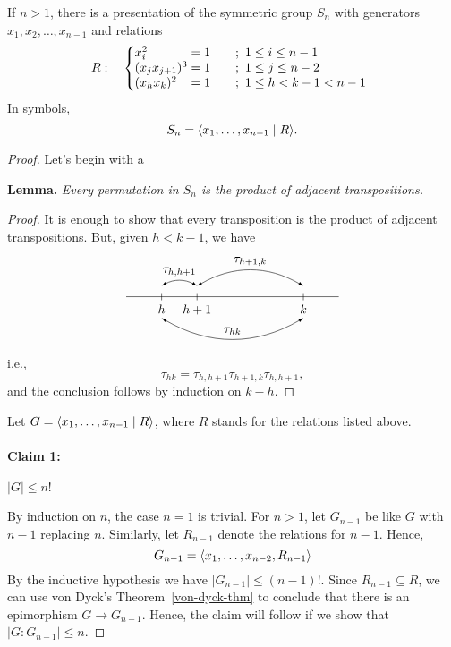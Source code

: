 \begin{xmpl}
    If $n > 1$, there is a presentation of the symmetric group $S_n$ with generators $x_1,x_2, \dots,x_{n-1}$ and relations
    $$
    R:\quad \left\{
    \begin{array}{@{}l@{}l@{}l}
        x_i^2 &= 1  &\qquad;\ 1\le i\le n-1\\
        (x_jx_{j+1})^3\;&= 1&\qquad;\ 1\le j\le n-2\\
        (x_hx_k)^2 &= 1&\qquad;\ 1\le h<k-1<n-1
    \end{array}
    \right.
    $$
    In symbols,
    $$
        S_n = \langle x_1,\dots,x_{n-1}\mid R\rangle.
    $$
\end{xmpl}

\begin{proof} Let's begin with a

\textbf{Lemma.}
    \textit{Every permutation in\/ $S_n$ is the product of adjacent transpositions.}

\begin{proof}
    It is enough to show that every transposition is the product of adjacent transpositions. But, given $h<k-1$, we have
    $$
        \begin{tikzpicture}
          \draw[-] (-1,0) -- (5,0);
          \foreach \x/\label in {0/h, 1/h+1, 4/k} {
            \draw(\x,0.1) -- (\x,-0.1) node[below] {\(\label\)};
          }
          \draw[latex-latex, bend left=30] (0, 0.3) to node[midway, above] 
            {\(\tau_{h,h+1}\)} (1, 0.3);
          \draw[latex-latex, bend left=30] (1, 0.3) to node[midway, above]
            {\(\tau_{h+1,k}\)} (4, 0.3);
          \draw[latex-latex, bend right=30] (0, -0.6) to node[midway, above]
            {\(\tau_{hk}\)} (4, -0.6);
        \end{tikzpicture}
    $$
    i.e.,
    $$
        \tau_{hk} = \tau_{h,h+1}\tau_{h+1,k}\tau_{h,h+1},
    $$
    and the conclusion follows by induction on $k-h$.
    \renewcommand{\qedsymbol}{\sc qed}
\end{proof}

Let $G=\langle x_1,\dots,x_{n-1}\mid R\rangle$, where $R$ stands for the relations listed above.

\paragraph{Claim 1:}$|G|\le n!$

By induction on $n$, the case $n=1$ is trivial. For $n>1$, let $G_{n-1}$ be like $G$ with $n-1$ replacing $n$. Similarly, let $R_{n-1}$ denote the relations for $n-1$. Hence,
$$
    G_{n-1}=\langle x_1,\dots,x_{n-2}, R_{n-1}\rangle
$$
By the inductive hypothesis we have $|G_{n-1}|\le (n-1)!$. Since $R_{n-1}\subseteq R$, we can use von Dyck's Theorem~\ref{von-dyck-thm} to conclude that there is an epimorphism $G\to G_{n-1}$. Hence, the claim will follow if we show that $|G:G_{n-1}|\le n$.


\end{proof}
